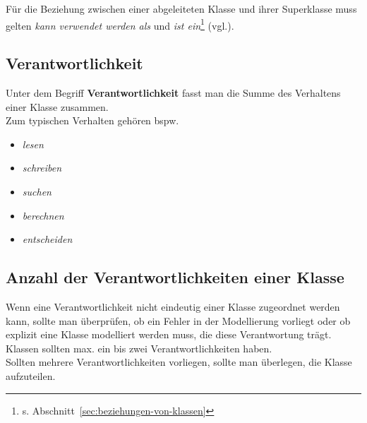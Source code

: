 \vspace{2mm}
\begin{tcolorbox}
    Für die Beziehung zwischen einer abgeleiteten Klasse und ihrer Superklasse muss gelten
    \textit{kann verwendet werden als} und \textit{ist ein}\footnote{
    s. Abschnitt~\ref{sec:beziehungen-von-klassen}
    } (vgl.\cite[16]{Wed09b}).
\end{tcolorbox}
\vspace{2mm}


\subsection*{Verantwortlichkeit}
Unter dem Begriff \textbf{Verantwortlichkeit} fasst man die Summe des Verhaltens einer Klasse zusammen.\\
Zum typischen Verhalten gehören bspw.

\begin{itemize}
    \item \textit{lesen}
    \item \textit{schreiben}
    \item \textit{suchen}
    \item \textit{berechnen}
    \item \textit{entscheiden}
\end{itemize}

\subsection*{Anzahl der Verantwortlichkeiten einer Klasse}
Wenn eine Verantwortlichkeit nicht eindeutig einer Klasse zugeordnet werden kann, sollte man überprüfen, ob ein Fehler in der Modellierung vorliegt oder ob explizit eine Klasse modelliert werden muss, die diese Verantwortung trägt.\\

\noindent
Klassen sollten max. ein bis zwei Verantwortlichkeiten haben.\\
Sollten mehrere Verantwortlichkeiten vorliegen, sollte man überlegen, die Klasse aufzuteilen.